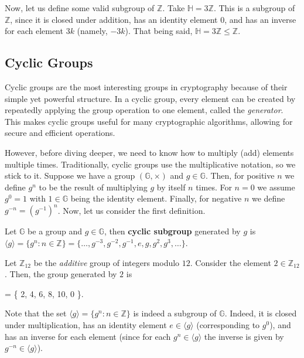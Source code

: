 \documentclass[../../book.tex]{subfiles}
\begin{document}
\begin{example}
    Now, let us define some valid subgroup of $\mathbb{Z}$. Take $\mathbb{H} =
    3\mathbb{Z}$. This is a subgroup of $\mathbb{Z}$, since it is closed under
    addition, has an identity element $0$, and has an inverse for each element
    $3k$ (namely, $-3k$). That being said, $\mathbb{H} = 3\mathbb{Z} \leq \mathbb{Z}$.
\end{example}

\subsection{Cyclic Groups}

Cyclic groups are the most interesting groups in cryptography because of their
simple yet powerful structure. In a cyclic group,
every element can be created by repeatedly applying the group operation to one
element, called the \emph{generator}. This makes cyclic groups useful for many
cryptographic algorithms, allowing for secure and efficient operations. 

However, before diving deeper, we need to know how to multiply (add) elements
multiple times. Traditionally, cyclic groups use the multiplicative notation, so
we stick to it. Suppose we have a group $(\mathbb{G},\times)$ and $g \in
\mathbb{G}$. Then, for positive $n$ we define $g^n$ to be the result of
multiplying $g$ by itself $n$ times. For $n=0$ we assume $g^0=1$ with $1 \in
\mathbb{G}$ being the identity element. Finally, for negative $n$ we define
$g^{-n} = (g^{-1})^n$. Now, let us consider the first definition.
\begin{definition}
    Let $\mathbb{G}$ be a group and $g \in \mathbb{G}$, then \textbf{cyclic subgroup} generated 
    by $g$ is $\langle g \rangle = \{g^n: n \in \mathbb{Z}\} = 
    \{\dots,g^{-3}, g^{-2}, g^{-1}, e, g, g^2, g^3, \dots\}$.
\end{definition}

\begin{example}
    Let $\mathbb{Z}_{12}$ be the \emph{additive} group of integers modulo $12$. 
    Consider the element $2 \in \mathbb{Z}_{12}$. Then, the group generated by $2$ is
    \begin{xequation}
         \rangle = \{ 2, 4, 6, 8, 10, 0 \}.
    \end{xequation}
\end{example}

\vspace{-1mm}

Note that the set $\langle g \rangle = \{g^n: n \in \mathbb{Z}\}$ is indeed a
subgroup of $\mathbb{G}$. Indeed, it is closed under multiplication, has an
identity element $e \in \langle g \rangle$ (corresponding to $g^0$), and has an
inverse for each element (since for each $g^n \in \langle g \rangle$ the inverse is given 
by $g^{-n} \in \langle g \rangle$).
\end{document}
